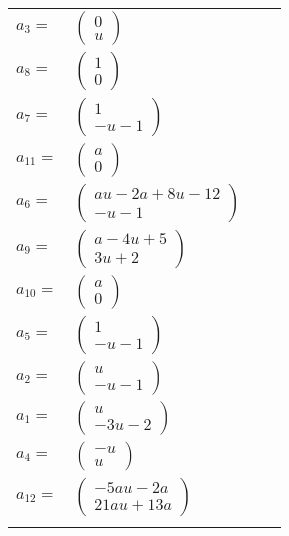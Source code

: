 \documentclass[1p]{elsarticle_modified}
\theoremstyle{definition}
\begin{document}
\begin{tabular}{m{7pt} m{180pt} m{7pt} m{180pt} }
\flushright $a_{3}=$&$\begin{pmatrix}0\\u\end{pmatrix}$ \\
\flushright $a_{8}=$&$\begin{pmatrix}1\\0\end{pmatrix}$ \\
\flushright $a_{7}=$&$\begin{pmatrix}1\\- u-1\end{pmatrix}$ \\
\flushright $a_{11}=$&$\begin{pmatrix}a\\0\end{pmatrix}$ \\
\flushright $a_{6}=$&$\begin{pmatrix}a u-2 a+8 u-12\\- u-1\end{pmatrix}$ \\
\flushright $a_{9}=$&$\begin{pmatrix}a-4 u+5\\3 u+2\end{pmatrix}$ \\
\flushright $a_{10}=$&$\begin{pmatrix}a\\0\end{pmatrix}$ \\
\flushright $a_{5}=$&$\begin{pmatrix}1\\- u-1\end{pmatrix}$ \\
\flushright $a_{2}=$&$\begin{pmatrix}u\\- u-1\end{pmatrix}$ \\
\flushright $a_{1}=$&$\begin{pmatrix}u\\-3 u-2\end{pmatrix}$ \\
\flushright $a_{4}=$&$\begin{pmatrix}- u\\u\end{pmatrix}$ \\
\flushright $a_{12}=$&$\begin{pmatrix}-5 a u-2 a\\21 a u+13 a\end{pmatrix}$\\&\end{tabular}
\end{document}
